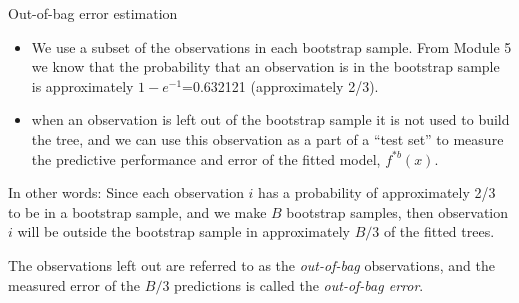 \documentclass[ignorenonframetext,]{beamer}
\providecommand{\tightlist}{%
  \setlength{\itemsep}{0pt}\setlength{\parskip}{0pt}}
\begin{document}
\begin{frame}

\begin{block}{Out-of-bag error estimation}

\begin{itemize}
\tightlist
\item
  We use a subset of the observations in each bootstrap sample. From
  Module 5 we know that the probability that an observation is in the
  bootstrap sample is approximately \(1-e^{-1}\)=0.632121 (approximately
  2/3).
\item
  when an observation is left out of the bootstrap sample it is not used
  to build the tree, and we can use this observation as a part of a
  ``test set'' to measure the predictive performance and error of the
  fitted model, \(f^{*b}(x)\).
\end{itemize}

In other words: Since each observation \(i\) has a probability of
approximately 2/3 to be in a bootstrap sample, and we make \(B\)
bootstrap samples, then observation \(i\) will be outside the bootstrap
sample in approximately \(B/3\) of the fitted trees.

The observations left out are referred to as the \emph{out-of-bag}
observations, and the measured error of the \(B/3\) predictions is
called the \emph{out-of-bag error}.

\end{block}

\end{frame}
\end{document}
